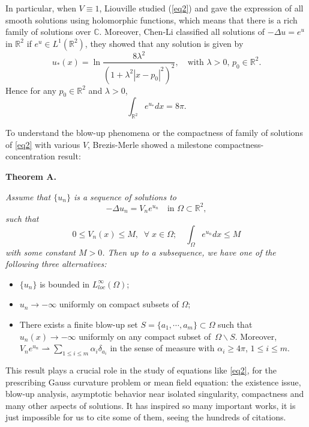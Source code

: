 \documentclass[11pt]{amsart}
\numberwithin{equation}{section}
\newcommand{\C}{\mathbb{C}}
\newcommand{\R}{\mathbb{R}}
\begin{document}
In particular, when $V\equiv1$, Liouville \cite{L1853} studied (\ref{eq2}) and gave the expression of all smooth solutions using holomorphic functions, which means that there is a rich family of solutions over $\C$. Moreover, Chen-Li \cite{CL} classified all solutions of  $-\Delta u = e^u$ in $\R^2$ if $e^{u}\in L^{1}(\mathbb{R}^{2})$, they showed that any solution is given by
$$u_*(x)=\ln\frac{8\lambda^{2}}{(1+\lambda^{2}|x-p_0|^{2})^{2}}, \quad \mbox{with } \lambda > 0, \, p_0\in\mathbb{R}^{2}.$$
Hence for any $p_0 \in \R^2$ and $\lambda > 0$,
$$\int_{\mathbb{R}^{2}}e^{u_*}dx=8\pi.$$

To understand the blow-up phenomena or the compactness of family of solutions of  \eqref{eq2} with various $V$, Brezis-Merle \cite{BM1991} showed a milestone compactness-concentration result:

\medskip
\noindent
{\bf Theorem A.} {\it Assume that $\{u_{n}\}$ is a sequence of solutions to
$$-\Delta u_{n}=V_{n} e^{u_{n}} \quad \mbox{in } \Omega\subset\mathbb{R}^{2},$$
such that
$$0\leq V_{n}(x)\leq M, \;\;\forall\; x\in\Omega; \quad \int_{\Omega}e^{u_{n}}dx\leq M$$
with some constant $M > 0$. Then up to a subsequence, we have one of the following three alternatives:
\begin{itemize}
\item[(i)] $\{u_{n}\}$ is bounded in $L^{\infty}_{loc}(\Omega)$;
\item[(ii)] $u_{n}\rightarrow-\infty$ uniformly on compact subsets of $\Omega$;
\item[(iii)] There exists a finite blow-up set $S=\{a_{1},\cdots,a_{m}\}\subset\Omega$ such that $u_{n}(x)\rightarrow-\infty$ uniformly on any compact subset of  $\, \Omega\backslash S$. Moreover, $V_{n}e^{u_{n}}\rightharpoonup\sum_{1 \le i \le m}\alpha_{i}\delta_{a_{i}}$ in the sense of measure with $\alpha_{i}\geq4\pi$, $1\leq i\leq m$.
\end{itemize}}

\noindent This result plays a crucial role in the study of equations like \eqref{eq2}, for the prescribing Gauss curvature problem or mean field equation: the existence issue, blow-up analysis, asymptotic behavior near isolated singularity, compactness and many other aspects of solutions. It has inspired so many important works, it is just impossible for us to cite some of them, seeing the hundreds of citations.
\end{document}
